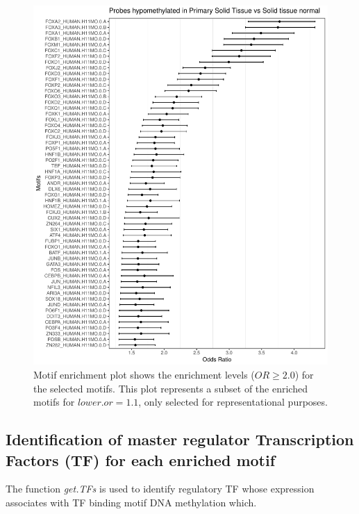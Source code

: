 %

\begin{figure}[ht!]
\centering
\includegraphics[width=1.0\textwidth]{images/OR_nosummary.pdf}
\caption{\label{fig:boxplot2} Motif enrichment plot shows the enrichment levels ($OR\geq2.0$) for the selected motifs. This plot represents a subset of the enriched motifs for $\textit{lower.or}= 1.1$, only selected for representational purposes.}
\end{figure}

\subsection*{Identification of master regulator Transcription Factors (TF) for each enriched motif}
The function \textit{get.TFs} is used to identify regulatory TF whose expression associates with TF binding motif 
DNA methylation which.

